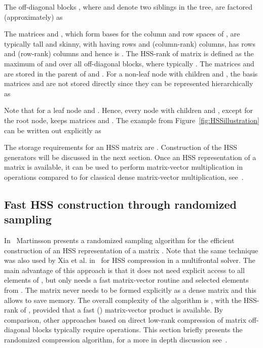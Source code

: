\documentclass{article}
\begin{document}
The off-diagonal blocks ,
where  and  denote two siblings in the tree, are
factored (approximately) as

The matrices  and
, which form bases for the column and row
spaces of , are typically tall and skinny, with
 having  rows and 
(column-rank) columns,  has 
rows and  (row-rank) columns and hence 
is . The HSS-rank  of matrix  is
defined as the maximum of  and  over all
off-diagonal blocks, where typically . The matrices
 and  are stored in the parent of
 and . For a non-leaf node  with children 
and , the basis matrices  and
 are not stored directly since they can be
represented hierarchically as

Note that for a leaf node  and
. Hence, every node  with
children  and , except for the root node, keeps matrices
 and . The example from
Figure~\ref{fig:HSSillustration} can be written out explicitly as


The storage requirements for an HSS matrix are
. Construction of the HSS generators will be
discussed in the next section. Once an HSS representation of a matrix
is available, it can be used to perform matrix-vector multiplication
in  operations compared to  for
classical dense matrix-vector multiplication,
see~\cite{martinsson2011fast,FHR}.








\subsection{Fast HSS construction through randomized sampling}\label{sec:HSSconstruction}
In~\cite{martinsson2011fast} Martinsson presents a randomized sampling
algorithm for the efficient construction of an HSS representation of a
matrix . Note that the same technique was also used by Xia et
al. in~\cite{xia2012superfast,xia2013randomized} for HSS compression
in a multifrontal solver. The main advantage of this approach is that
it does not need explicit access to all elements of , but only
needs a fast matrix-vector routine and selected elements from . The
matrix  never needs to be formed explicitly as a dense matrix and
this allows to save memory. The overall complexity of the algorithm is
, with  the HSS-rank of , provided that a
fast () matrix-vector product is available. By
comparison, other approaches based on direct low-rank compression of
matrix off-diagonal blocks typically require 
operations. This section briefly presents the randomized compression
algorithm, for a more in depth discussion
see~\cite{FHR,martinsson2011fast}.
\end{document}
